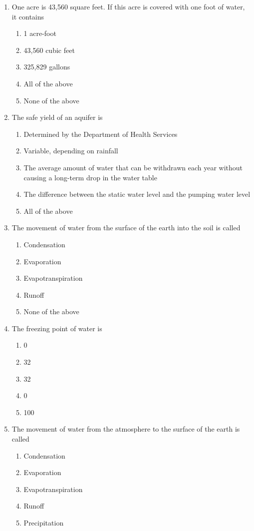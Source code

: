 \begin{enumerate}
\item One acre is 43,560 square feet. If this acre is covered with one foot of water, it contains
\begin{enumerate}
\item 1 acre-foot
\item 43,560 cubic feet
\item 325,829 gallons
\item All of the above
\item None of the above
\end{enumerate}

\item The safe yield of an aquifer is
\begin{enumerate}
\item Determined by the Department of Health Services
\item Variable, depending on rainfall
\item The average amount of water that can be withdrawn each year without causing a long-term drop in the water table
\item The difference between the static water level and the pumping water level
\item All of the above
\end{enumerate}

\item The movement of water from the surface of the earth into the soil is called
\begin{enumerate}
\item Condensation
\item Evaporation
\item Evapotranspiration
\item Runoff
\item None of the above
\end{enumerate}

\item The freezing point of water is
\begin{enumerate}
\item 0
\item 32
\item 32
\item 0
\item 100
\end{enumerate}

\item The movement of water from the atmosphere to the surface of the earth is called
\begin{enumerate}
\item Condensation
\item Evaporation
\item Evapotranspiration
\item Runoff
\item Precipitation
\end{enumerate}


\end{enumerate}
